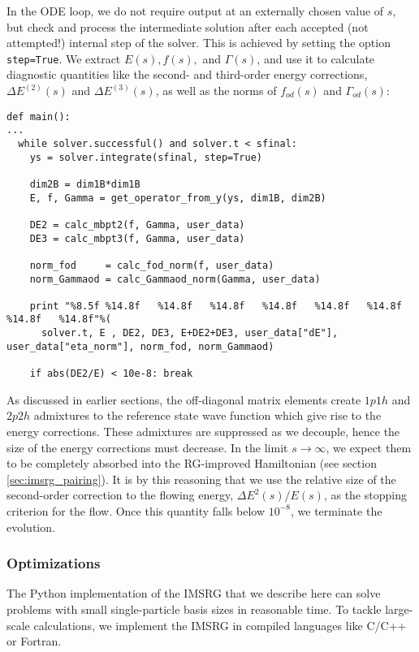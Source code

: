 In the ODE loop, we do not require output at an externally chosen
value of $s$, but check and process the intermediate solution after
each accepted (not attempted!) internal step of the solver. This is
achieved by setting the option \texttt{step=True}. We extract 
$E(s), f(s),$ and $\Gamma(s)$, and use it to calculate diagnostic
quantities like the second- and third-order energy corrections, 
$\Delta E^{(2)}(s)$ and $\Delta E^{(3)}(s)$, as well as the norms 
of $f_{od}(s)$ and $\Gamma_{od}(s)$:  
\begin{lstlisting}
def main():
...
  while solver.successful() and solver.t < sfinal:
    ys = solver.integrate(sfinal, step=True)
    
    dim2B = dim1B*dim1B
    E, f, Gamma = get_operator_from_y(ys, dim1B, dim2B)

    DE2 = calc_mbpt2(f, Gamma, user_data)
    DE3 = calc_mbpt3(f, Gamma, user_data)

    norm_fod     = calc_fod_norm(f, user_data)
    norm_Gammaod = calc_Gammaod_norm(Gamma, user_data)

    print "%8.5f %14.8f   %14.8f   %14.8f   %14.8f   %14.8f   %14.8f   %14.8f   %14.8f"%(
      solver.t, E , DE2, DE3, E+DE2+DE3, user_data["dE"], user_data["eta_norm"], norm_fod, norm_Gammaod)

    if abs(DE2/E) < 10e-8: break

\end{lstlisting}
As discussed in earlier sections, the off-diagonal matrix elements 
create $1p1h$ and $2p2h$ admixtures to the reference state wave function 
which give rise to the energy corrections. These admixtures are suppressed
as we decouple, hence the size of the energy corrections must decrease.
In the limit $s\to\infty$, we expect them to be completely absorbed into
the RG-improved Hamiltonian (see section \ref{sec:imsrg_pairing}). It is
by this reasoning that we use the relative size of the second-order correction
to the flowing energy, $\Delta E^2(s)/E(s)$, as the stopping criterion for
the flow. Once this quantity falls below $10^{-8}$, we terminate the evolution.

\subsubsection*{Optimizations}
The Python implementation of the IMSRG that we describe here can solve
problems with small single-particle basis sizes in reasonable time. To 
tackle large-scale calculations, we implement the IMSRG in compiled
languages like C/C++ or Fortran.

